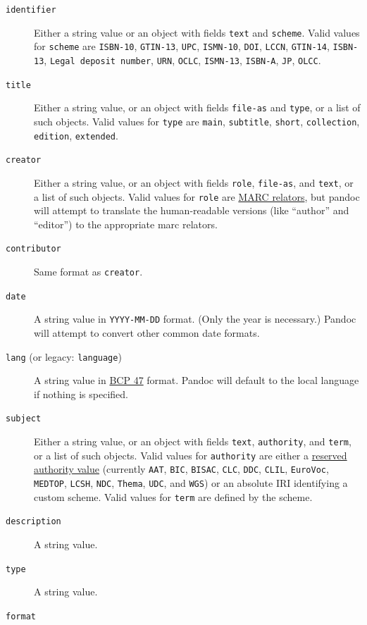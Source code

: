 \documentclass[
  b5paper
]{book}
\begin{document}
\begin{description}
\item[\texttt{identifier}]
Either a string value or an object with fields \texttt{text} and
\texttt{scheme}. Valid values for \texttt{scheme} are \texttt{ISBN-10},
\texttt{GTIN-13}, \texttt{UPC}, \texttt{ISMN-10}, \texttt{DOI},
\texttt{LCCN}, \texttt{GTIN-14}, \texttt{ISBN-13},
\texttt{Legal\ deposit\ number}, \texttt{URN}, \texttt{OCLC},
\texttt{ISMN-13}, \texttt{ISBN-A}, \texttt{JP}, \texttt{OLCC}.
\item[\texttt{title}]
Either a string value, or an object with fields \texttt{file-as} and
\texttt{type}, or a list of such objects. Valid values for \texttt{type}
are \texttt{main}, \texttt{subtitle}, \texttt{short},
\texttt{collection}, \texttt{edition}, \texttt{extended}.
\item[\texttt{creator}]
Either a string value, or an object with fields \texttt{role},
\texttt{file-as}, and \texttt{text}, or a list of such objects. Valid
values for \texttt{role} are
\href{https://loc.gov/marc/relators/relaterm.html}{MARC relators}, but
pandoc will attempt to translate the human-readable versions (like
``author'' and ``editor'') to the appropriate marc relators.
\item[\texttt{contributor}]
Same format as \texttt{creator}.
\item[\texttt{date}]
A string value in \texttt{YYYY-MM-DD} format. (Only the year is
necessary.) Pandoc will attempt to convert other common date formats.
\item[\texttt{lang} (or legacy: \texttt{language})]
A string value in \href{https://tools.ietf.org/html/bcp47}{BCP 47}
format. Pandoc will default to the local language if nothing is
specified.
\item[\texttt{subject}]
Either a string value, or an object with fields \texttt{text},
\texttt{authority}, and \texttt{term}, or a list of such objects. Valid
values for \texttt{authority} are either a
\href{https://idpf.github.io/epub-registries/authorities/}{reserved
authority value} (currently \texttt{AAT}, \texttt{BIC}, \texttt{BISAC},
\texttt{CLC}, \texttt{DDC}, \texttt{CLIL}, \texttt{EuroVoc},
\texttt{MEDTOP}, \texttt{LCSH}, \texttt{NDC}, \texttt{Thema},
\texttt{UDC}, and \texttt{WGS}) or an absolute IRI identifying a custom
scheme. Valid values for \texttt{term} are defined by the scheme.
\item[\texttt{description}]
A string value.
\item[\texttt{type}]
A string value.
\item[\texttt{format}]

\end{description}
\end{document}
